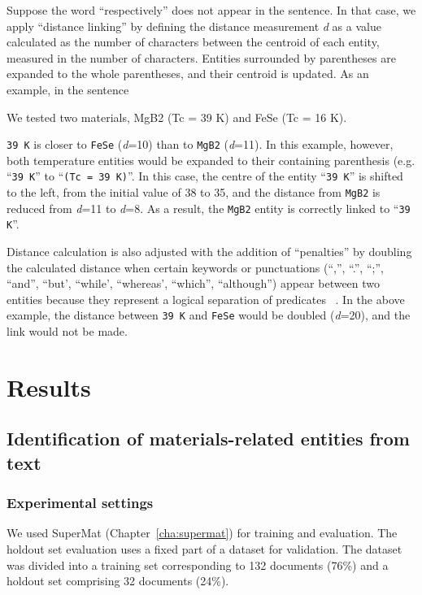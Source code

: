 Suppose the word ``respectively'' does not appear in the sentence. In that case, we apply ``distance linking'' by defining the distance measurement \textit{d} as a value calculated as the number of characters between the centroid of each entity, measured in the number of characters.
Entities surrounded by parentheses are expanded to the whole parentheses, and their centroid is updated.
As an example, in the sentence
\begin{displayquote}
    We tested two materials, MgB2 (Tc = 39 K) and FeSe (Tc = 16 K).
\end{displayquote}

\texttt{39 K} is closer to \texttt{FeSe} (\textit{d}=10) than to \texttt{MgB2} (\textit{d}=11). 
In this example, however, both temperature entities would be expanded to their containing parenthesis (e.g. ``\texttt{39 K}'' to ``\texttt{(Tc = 39 K)}''. 
In this case, the centre of the entity ``\texttt{39 K}'' is shifted to the left, from the initial value of 38 to 35, and the distance from \texttt{MgB2} is reduced from \textit{d}=11 to \textit{d}=8.
As a result, the \texttt{MgB2} entity is correctly linked to ``\texttt{39 K}''.

Distance calculation is also adjusted with the addition of ``penalties'' by doubling the calculated distance when certain keywords or punctuations (``,'', ``.'', ``;'', ``and'', ``but', ``while', ``whereas', ``which'', ``although'') appear between two entities because they represent a logical separation of predicates ~\cite{oka2021table}.
In the above example, the distance between \texttt{39 K} and \texttt{FeSe} would be doubled (\textit{d}=20), and the link would not be made.

\section{Results}

\subsection{Identification of materials-related entities from text}
\subsubsection{Experimental settings}

We used SuperMat (Chapter~\ref{cha:supermat}) for training and evaluation. The holdout set evaluation uses a fixed part of a dataset for validation. 
The dataset was divided into a training set corresponding to 132 documents (76\%) and a holdout set comprising 32 documents (24\%). 

